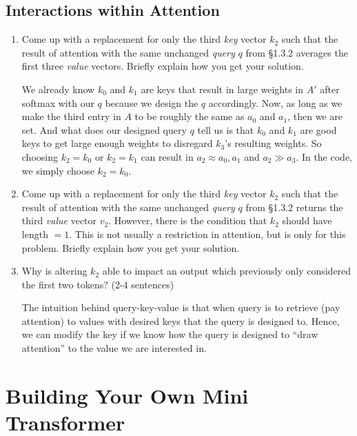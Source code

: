 \documentclass{article}
\newenvironment{solution}{\color{blue}}{}
\begin{document}
\subsection{Interactions within Attention}
\begin{enumerate}
    \item Come up with a replacement for only the third \textit{key} vector $k_2$ such that the result of attention with the same unchanged \textit{query} $q$ from \S 1.3.2 averages the first three \textit{value} vectors. Briefly explain how you get your solution.
    
    \begin{solution}
      We already know $k_0$ and $k_1$ are keys that result in large weights in $A'$ after softmax with our $q$ because we design the $q$ accordingly. Now, as long as we make the third entry in $A$ to be roughly the same as $a_0$ and $a_1$, then we are set. And what does our designed query $q$ tell us is that $k_0$ and $k_1$ are good keys to get large enough weights to disregard $k_3$'s resulting weights. So choosing $k_2 = k_0$ or $k_2 = k_1$ can result in $a_2 \approx a_0, a_1$ and $a_2 \gg a_3$. In the code, we simply choose $k_2 = k_0$.
    \end{solution}

    \item Come up with a replacement for only the third \textit{key} vector $k_2$ such that the result of attention with the same unchanged \textit{query} $q$ from \S 1.3.2 returns the third \textit{value} vector $v_2$.
    However, there is the condition that $k_2$ should have length $=1$. This is not usually a restriction in attention, but is only for this problem. Briefly explain how you get your solution.

    \item Why is altering $k_2$ able to impact an output which previously only considered the first two tokens? (2-4 sentences)
    
    \begin{solution}
      The intuition behind query-key-value is that when query is to retrieve (pay attention) to values with desired keys that the query is designed to. Hence, we can modify the key if we know how the query is designed to ``draw attention'' to the value we are interested in.
    \end{solution}
\end{enumerate}

\newpage

\section{Building Your Own Mini Transformer}
\end{document}
